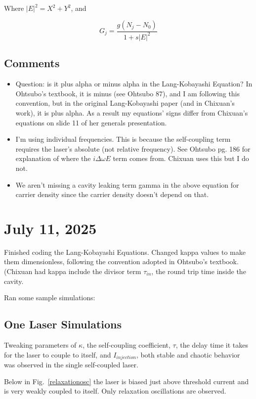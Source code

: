 \documentclass[11pt,letterpaper]{article}
\begin{document}
Where $|E|^2 = X^2 + Y^2$, and

\[
G_j = \frac{g(N_j - N_0)}{1 + s |E|^2}
\]

\subsection{Comments}
\begin{itemize}
    \item Question: is it plus alpha or minus alpha in the Lang-Kobayashi Equation? In Ohtsubo's textbook, it is minus (see Ohtsubo 87), and I am following this convention, but in the original Lang-Kobayashi paper (and in Chixuan's work), it is plus alpha. As a result my equations' signs differ from Chixuan's equations on slide 11 of her generals presentation.
    \item I'm using individual frequencies. This is because the self-coupling term requires the laser's absolute (not relative frequency). See Ohtsubo pg. 186 for explanation of where the $i\Delta\omega E$ term comes from. Chixuan uses this but I do not.
    \item We aren't missing a cavity leaking term gamma in the above equation for carrier density since the carrier density doesn't depend on that.
\end{itemize}

\section{July 11, 2025}

Finished coding the Lang-Kobayashi Equations. Changed kappa values to make them dimensionless, following the convention adopted in Ohtsubo's textbook. (Chixuan had kappa include the divisor term $\tau_{in}$, the round trip time inside the cavity.

Ran some sample simulations:

\subsection{One Laser Simulations}

Tweaking parameters of $\kappa$, the self-coupling coefficient, $\tau$, the delay time it takes for the laser to couple to itself, and $I_{injection}$, both stable and chaotic behavior was observed in the single self-coupled laser.

Below in Fig.~\ref{relaxationosc} the laser is biased just above threshold current and is very weakly coupled to itself. Only relaxation oscillations are observed.
\end{document}
